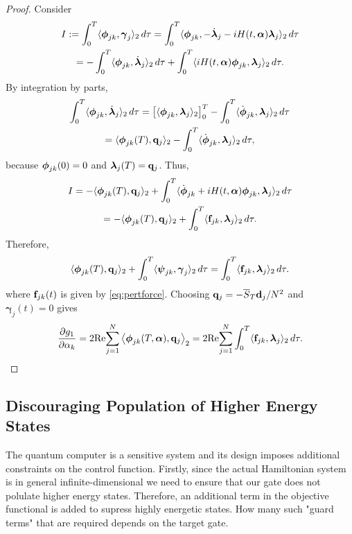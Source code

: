 \documentclass[11pt]{article}
\begin{document}
\begin{proof}
Consider
\begin{multline}
  I:= \int_0^T \langle \boldsymbol{\phi}_{jk}, \boldsymbol{\gamma}_j \rangle_2\, d\tau =  \int_0^T \langle \boldsymbol{\phi}_{jk},
  -\dot{\boldsymbol{\lambda}}_j - iH(t,\boldsymbol{\alpha})\boldsymbol{\lambda}_j \rangle_2\, d\tau \\
  =  -\int_0^T \langle  \boldsymbol{\phi}_{jk},
  \dot{\boldsymbol{\lambda}}_{j} \rangle_2\, d\tau +  \int_0^T \langle iH(t,\boldsymbol{\alpha}) \boldsymbol{\phi}_{jk},\boldsymbol{\lambda}_j \rangle_2\, d\tau.
\end{multline}
By integration by parts,
\begin{multline*}
\int_0^T \langle  \phib_{jk}, \dot{\lambdab}_{j} \rangle_2\, d\tau =
%
\left[ \langle \phib_{jk}, \lambdab_j \rangle_2 \right]_0^T - \int_0^T \langle  \dot{\phib}_{jk},
\lambdab_{j} \rangle_2\, d\tau\\
%
= \langle \phib_{jk}(T), \qb_j \rangle_2  - \int_0^T \langle  \dot{\phib}_{jk}, \lambdab_{j} \rangle_2\, d\tau,
\end{multline*}
because $\boldsymbol{\phi}_{jk}(0)=0$ and $\boldsymbol{\lambda}_j(T) = {\mathbf q}_j$. Thus,
\begin{multline*}
I = -\langle \phib_{jk}(T), \qb_j \rangle_2 + \int_0^T \langle \dot{\phib}_{jk} + iH(t,\alphab)
\phib_{jk},\lambdab_j \rangle_2\, d\tau\\
%
= -\langle \phib_{jk}(T), \qb_j \rangle_2 + \int_0^T \langle \fb_{jk},\lambdab_j \rangle_2\, d\tau.
\end{multline*}
Therefore,
\begin{equation}\label{eq:adjointrel}
 \langle \boldsymbol{\phi}_{jk}(T), {\mathbf q}_j \rangle_2 + \int_0^T \langle \boldsymbol{\psi}_{jk},\boldsymbol{\gamma}_j\rangle_2\, d\tau = \int_0^T \langle {\mathbf f}_{jk},\boldsymbol{\lambda}_j \rangle_2\, d\tau.
\end{equation}
where ${\mathbf f}_{jk}(t)$ is given by \eqref{eq:pertforce}. Choosing ${\mathbf q}_j = -\overline{S}_T {\mathbf d}_j/N^2$ and $\boldsymbol{\gamma}_j(t)=0$ gives
\begin{equation}\label{eq:sensitivity}
  \frac{\partial g_1}{\partial \alpha_k} =  2 {\rm Re}\! \sum_{j=1}^N \left\langle \boldsymbol{\phi}_{jk}(T,\boldsymbol{\alpha}),
  {\mathbf q}_j\right\rangle_2 =
  2 {\rm Re}\! \sum_{j=1}^N \int_0^T \langle {\mathbf f}_{jk},\boldsymbol{\lambda}_j \rangle_2\, d\tau.
\end{equation}
\end{proof}



\subsection{Discouraging Population of Higher Energy States} \label{subsec:guarlevels}
The quantum computer is a sensitive system and its design imposes additional constraints on the control function. 
Firstly, since the actual Hamiltonian system is in general infinite-dimensional we need to ensure that our gate does not polulate higher energy states. Therefore, an additional term in the objective functional is added to supress highly energetic states. How many such "guard terms" that are required depends on the target gate. 
\end{document}
